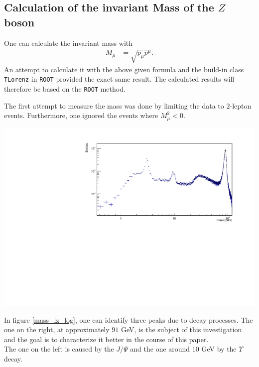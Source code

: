 \documentclass[12pt, a4paper, bibliography=totoc]{scrartcl}
\begin{document}
\begin{multicols}{2}
\subsection{Calculation of the invariant Mass of the $Z$ boson}
One can calculate the invariant mass with
\begin{align}
	M_{\mu} &= \sqrt{p_{\mu}p^{\mu}}. 
\end{align}
An attempt to calculate it with the above given formula and the build-in class \verb*+TLorenz+ in \verb*+ROOT+ provided the exact same result. 
The calculated results will therefore be based on the \verb*+ROOT+ method.

The first attempt to measure the mass was done by limiting the data to $2$-lepton events. 
Furthermore, one ignored the events where $M_{\mu}^{2} < 0$. 
\begin{center}
	\includegraphics[width=\linewidth]{fig/invar_mass_dist_corrected_axis_title.pdf}
	\label{mass_lz_log}
\end{center}

In figure \ref{mass_lz_log}, one can identify three peaks due to decay processes. 
The one on the right, at approximately $91$ \si{GeV}, is the subject of this investigation and the goal is to characterize it better in the course of this paper.\\
The one on the left is caused by the $J/{\Psi}$ and the one around $10$ \si{GeV} by the $\Upsilon$ decay. 


\end{multicols}
\end{document}
